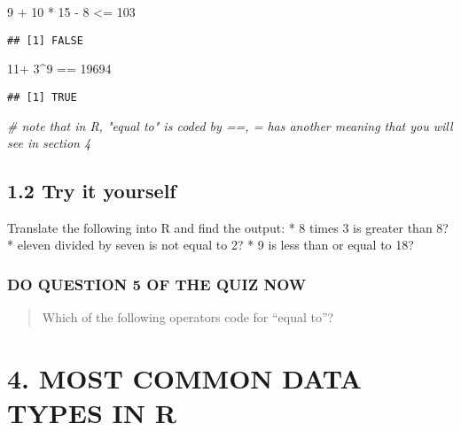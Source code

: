 \documentclass[
]{book}
\newenvironment{Shaded}{\begin{snugshade}}{\end{snugshade}}
\newcommand{\CommentTok}[1]{\textcolor[rgb]{0.56,0.35,0.01}{\textit{#1}}}
\newcommand{\DecValTok}[1]{\textcolor[rgb]{0.00,0.00,0.81}{#1}}
\newcommand{\SpecialCharTok}[1]{\textcolor[rgb]{0.00,0.00,0.00}{#1}}
\begin{document}
\begin{Shaded}
\begin{Highlighting}[]
\DecValTok{9} \SpecialCharTok{+} \DecValTok{10} \SpecialCharTok{*} \DecValTok{15} \SpecialCharTok{{-}} \DecValTok{8} \SpecialCharTok{\textless{}=} \DecValTok{103}
\end{Highlighting}
\end{Shaded}

\begin{verbatim}
## [1] FALSE
\end{verbatim}

\begin{Shaded}
\begin{Highlighting}[]
\DecValTok{11}\SpecialCharTok{+} \DecValTok{3}\SpecialCharTok{\^{}}\DecValTok{9} \SpecialCharTok{==} \DecValTok{19694}
\end{Highlighting}
\end{Shaded}

\begin{verbatim}
## [1] TRUE
\end{verbatim}

\begin{Shaded}
\begin{Highlighting}[]
    \CommentTok{\# note that in R, "equal to" is coded by ==, = has another meaning that you will see in section 4}
\end{Highlighting}
\end{Shaded}

\hypertarget{try-it-yourself-1}{%
\subsection{1.2 Try it yourself}\label{try-it-yourself-1}}

Translate the following into R and find the output:
* 8 times 3 is greater than 8?
* eleven divided by seven is not equal to 2?
* 9 is less than or equal to 18?

\hypertarget{do-question-5-of-the-quiz-now}{%
\subsubsection{DO QUESTION 5 OF THE QUIZ NOW}\label{do-question-5-of-the-quiz-now}}

\begin{quote}
Which of the following operators code for ``equal to''?
\end{quote}

\hypertarget{most-common-data-types-in-r}{%
\section{4. MOST COMMON DATA TYPES IN R}\label{most-common-data-types-in-r}}
\end{document}
